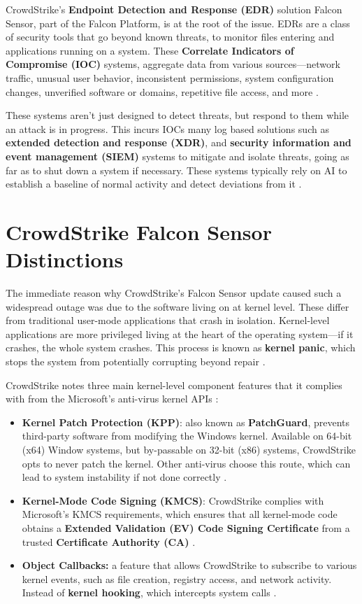 CrowdStrike's \textbf{Endpoint Detection and Response (EDR)} solution Falcon Sensor, part of the Falcon Platform, is at the root of the issue.
EDRs are a class of security tools that go beyond known threats, to monitor files entering and applications running on a system.
These \textbf{Correlate Indicators of Compromise (IOC)} systems, aggregate data from various sources---network traffic, unusual user behavior,
inconsistent permissions, system configuration changes, unverified software or domains, repetitive file access, and more \cite{microsoft_ioc}.

These systems aren't just designed to detect threats, but respond to them while an attack is in progress. This incurs IOCs many log based solutions such as
\textbf{extended detection and response (XDR)}, and \textbf{security information and event management (SIEM)} systems to mitigate and isolate threats, going
as far as to shut down a system if necessary. These systems typically rely on AI to establish a baseline of normal activity and detect deviations from it \cite{microsoft_ioc}.

\section{CrowdStrike Falcon Sensor Distinctions}

The immediate reason why CrowdStrike's Falcon Sensor update caused such a widespread outage was due to
the software living on at kernel level. These differ from traditional user-mode applications that crash in isolation.
Kernel-level applications are more privileged living at the heart of the operating system---if it crashes, the whole system crashes.
This process is known as \textbf{kernel panic}, which stops the system from potentially corrupting beyond repair \cite{awati_kernel_panic}.

CrowdStrike notes three main kernel-level component features that it complies with from the Microsoft's anti-virus kernel APIs \cite{ionescu_kernel_access_2024}:
\begin{itemize}
    \item \textbf{Kernel Patch Protection (KPP)}: also known as \textbf{PatchGuard}, prevents third-party software from modifying the Windows kernel.
          Available on 64-bit (x64) Window systems, but by-passable on 32-bit (x86) systems, CrowdStrike opts to never patch the kernel. Other
          anti-virus choose this route, which can lead to system instability if not done correctly \cite{wikipedia_kpp}.
    \item \textbf{Kernel-Mode Code Signing (KMCS)}: CrowdStrike complies with Microsoft's KMCS requirements, which ensures that all kernel-mode code obtains a
          \textbf{Extended Validation (EV) Code Signing Certificate} from a trusted \textbf{Certificate Authority (CA)} \cite{microsoft_kmcs}\cite{reasonlabs_kernel_hooking}.
    \item \textbf{Object Callbacks:} a feature that allows CrowdStrike to subscribe to various kernel events, such as file creation, registry access, and network activity.
          Instead of \textbf{kernel hooking}, which intercepts system calls \cite{microsoft_obregistercallbacks}.
\end{itemize}

